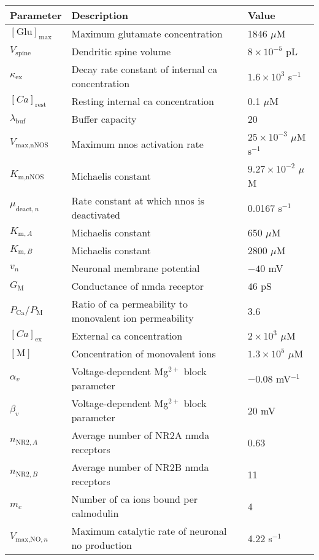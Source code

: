 \documentclass[11pt]{elsarticle}
\newcommand{\uM}{$\mu$M\xspace}
\newcommand{\n}{$^{-1}$\xspace}
\newcommand{\e}[1]{\times 10^{#1}}
\newcommand{\psec}{s$^{-1}$\xspace}
\newcommand{\ca}{\gls{ca}\xspace}
\begin{document}
\begin{longtable}[h!]{ p{0.12\linewidth}   p{0.64\linewidth}   p{0.24\linewidth} }
	\hline
	Parameter & Description & Value \\
	\hline
$ [\text{Glu}]_{\max} $			& Maximum glutamate concentration 						& 1846 \uM 	\\ 
$ V_{\text{spine}} $		& Dendritic spine volume 								& $8\e{-5}$ pL		\\ 
$ \kappa_{\text{ex}} $		& Decay rate constant of internal \ca concentration	& $1.6\e{3}$ s\n \\
$ [Ca]_{\text{rest}} $		& Resting internal \ca concentration				& 0.1 \uM		\\
$ \lambda_{\text{buf}} $	& Buffer capacity										& 20 	\\
$ V_{\text{max,nNOS}} $		& Maximum \gls{nnos} activation rate							& $25\e{-3}$ \uM \psec	\\
$ K_{\text{m,nNOS}} $		& Michaelis constant									& $9.27\e{-2}$ \uM	\\			
$ \mu_{\text{deact},n} $	& Rate constant at which \gls{nnos} is deactivated 			& 0.0167 s\n	\\ 
$ K_{\text{m},A} $			& Michaelis constant & 650 \uM \\ 
$ K_{\text{m},B} $			& Michaelis constant  & 2800 \uM \\
$ v_n $						& Neuronal membrane potential							& $-40$ mV	 \\
$ G_\text{M} $				& Conductance of \gls{nmda} receptor  						& $46$ pS	\\ 
$ P_{\text{Ca}}/P_\text{M} $ & Ratio of \ca permeability to monovalent ion permeability & 3.6 \\
$ [Ca]_{\text{ex}} $   	& External \ca concentration						& $2\e{3}$ \uM  \\
$ [\text{M}] $ 				& Concentration of monovalent ions 						& $1.3\e{5}$ \uM  \\
$ \alpha_v $				& Voltage-dependent Mg$^{2+}$ block parameter			& $-0.08$ mV\n	\\ 
$ \beta_v $					& Voltage-dependent Mg$^{2+}$ block parameter			& 20 mV \\ 
$ n_{\text{NR2},A} $		& Average number of NR2A \gls{nmda} receptors 	& 0.63  \\
$ n_{\text{NR2},B} $		& Average number of NR2B \gls{nmda} receptors 	& 11   \\
$m_c$						& Number of \ca ions bound per calmodulin & 4 \\
$ V_{\text{max,NO},n} $ 	& Maximum catalytic rate of neuronal \gls{no} production 		& 4.22 s\n 	\\

\end{longtable}
\end{document}
